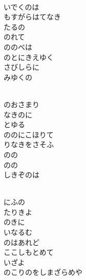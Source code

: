 \documentclass[10pt,b5j]{tarticle} %
\begin{document}
\begin{enumerate}
\begin{minipage}[c]{\blocksize}
        \vspace{\linespace}
        \item~\\
        いでくのは\\
        もすがらはてなき\\
        たるの\\
        のれて\\
        ののべは\\
        のとにきえゆく\\
        さびしらに\\
        みゆくの
        
    \end{minipage}
    \begin{minipage}[c]{\blocksize}
        
        \vspace{\linespace}
        \item~\\
        のおさまり\\
        なきのに\\
        とゆる\\
        ののにこほりて\\
        りなきをさそふ\\
        のの\\
        のの\\
        しきぞのは
        
    \end{minipage}
    \begin{minipage}[c]{\blocksize}
        
        \vspace{\linespace}
        \item~\\
        にふの\\
        たりきよ\\
        のきに\\
        いなるむ\\
        のはあれど\\
        ここしもとめて\\
        いざよ\\
        のこりのをしまざらめや
    
    \end{minipage}
\end{enumerate} %
\end{document}
